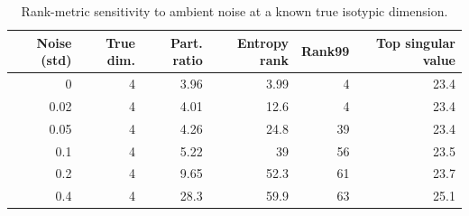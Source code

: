 \begin{table}
\caption{Rank-metric sensitivity to ambient noise at a known true isotypic dimension.}
\label{tab:metric_robustness}
\begin{tabular}{rrrrrr}
\toprule
Noise (std) & True dim. & Part. ratio & Entropy rank & Rank99 & Top singular value \\
\midrule
0 & 4 & 3.96 & 3.99 & 4 & 23.4 \\
0.02 & 4 & 4.01 & 12.6 & 4 & 23.4 \\
0.05 & 4 & 4.26 & 24.8 & 39 & 23.4 \\
0.1 & 4 & 5.22 & 39 & 56 & 23.5 \\
0.2 & 4 & 9.65 & 52.3 & 61 & 23.7 \\
0.4 & 4 & 28.3 & 59.9 & 63 & 25.1 \\
\bottomrule
\end{tabular}
\end{table}

